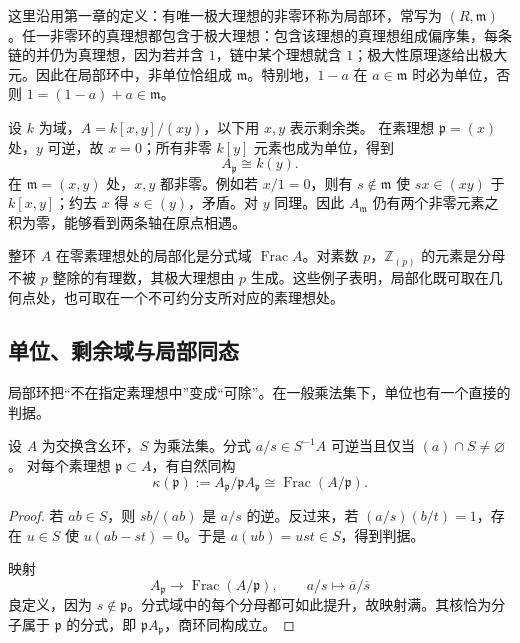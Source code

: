 这里沿用第一章的定义：有唯一极大理想的非零环称为局部环，常写为 \((R,\mathfrak m)\)。任一非零环的真理想都包含于极大理想：包含该理想的真理想组成偏序集，每条链的并仍为真理想，因为若并含 \(1\)，链中某个理想就含 \(1\)；极大性原理遂给出极大元。因此在局部环中，非单位恰组成 \(\mathfrak m\)。特别地，\(1-a\) 在 \(a\in\mathfrak m\) 时必为单位，否则 \(1=(1-a)+a\in\mathfrak m\)。

\begin{example}\label{g5:exm:localizing-axis}
	设 \(k\) 为域，\(A=k[x,y]/(xy)\)，以下用 \(x,y\) 表示剩余类。 在素理想 \(\mathfrak p=(x)\) 处，\(y\) 可逆，故 \(x=0\)；所有非零 \(k[y]\) 元素也成为单位，得到
	\[
	A_{\mathfrak p}\cong k(y).
	\]
	在 \(\mathfrak m=(x,y)\) 处，\(x,y\) 都非零。例如若 \(x/1=0\)，则有 \(s\notin\mathfrak m\) 使 \(sx\in(xy)\) 于 \(k[x,y]\)；约去 \(x\) 得 \(s\in(y)\)，矛盾。对 \(y\) 同理。因此 \(A_{\mathfrak m}\) 仍有两个非零元素之积为零，能够看到两条轴在原点相遇。
\end{example}

整环 \(A\) 在零素理想处的局部化是分式域 \(\operatorname{Frac}A\)。对素数 \(p\)，\(\mathbb Z_{(p)}\) 的元素是分母不被 \(p\) 整除的有理数，其极大理想由 \(p\) 生成。这些例子表明，局部化既可取在几何点处，也可取在一个不可约分支所对应的素理想处。

\subsection{单位、剩余域与局部同态}
\label{g5:subsec:0201:03}

局部环把“不在指定素理想中”变成“可除”。在一般乘法集下，单位也有一个直接的判据。

\begin{proposition}\label{g5:prop:units-residue-fields}
	设 \(A\) 为交换含幺环，\(S\) 为乘法集。分式 \(a/s\in S^{-1}A\) 可逆当且仅当 \((a)\cap S\ne\varnothing\)。 对每个素理想 \(\mathfrak p\subset A\)，有自然同构
	\[
	\kappa(\mathfrak p):=A_{\mathfrak p}/\mathfrak pA_{\mathfrak p}
	\cong\operatorname{Frac}(A/\mathfrak p).
	\]
\end{proposition}
\begin{proof}
	若 \(ab\in S\)，则 \(sb/(ab)\) 是 \(a/s\) 的逆。反过来，若 \((a/s)(b/t)=1\)，存在 \(u\in S\) 使 \(u(ab-st)=0\)。于是 \(a(ub)=ust\in S\)，得到判据。

	映射
	\[
	A_{\mathfrak p}\longrightarrow\operatorname{Frac}(A/\mathfrak p),
	\qquad a/s\longmapsto\overline a/\overline s
	\]
	良定义，因为 \(s\notin\mathfrak p\)。分式域中的每个分母都可如此提升，故映射满。其核恰为分子属于 \(\mathfrak p\) 的分式，即 \(\mathfrak pA_{\mathfrak p}\)，商环同构成立。
\end{proof}


